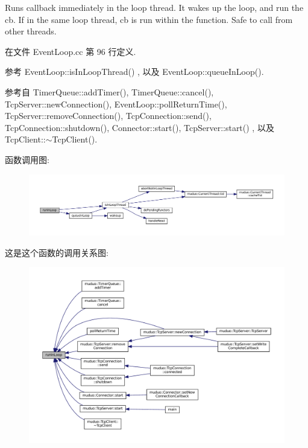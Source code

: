 Runs callback immediately in the loop thread. It wakes up the loop, and run the cb. If in the same loop thread, cb is run within the function. Safe to call from other threads. 

在文件 Event\+Loop.\+cc 第 96 行定义.



参考 Event\+Loop\+::is\+In\+Loop\+Thread() , 以及 Event\+Loop\+::queue\+In\+Loop().



参考自 Timer\+Queue\+::add\+Timer(), Timer\+Queue\+::cancel(), Tcp\+Server\+::new\+Connection(), Event\+Loop\+::poll\+Return\+Time(), Tcp\+Server\+::remove\+Connection(), Tcp\+Connection\+::send(), Tcp\+Connection\+::shutdown(), Connector\+::start(), Tcp\+Server\+::start() , 以及 Tcp\+Client\+::$\sim$\+Tcp\+Client().

函数调用图\+:
\nopagebreak
\begin{figure}[H]
\begin{center}
\leavevmode
\includegraphics[width=350pt]{classmuduo_1_1EventLoop_acf6a4570703c6edf29ae2d28cf6767cb_cgraph}
\end{center}
\end{figure}
这是这个函数的调用关系图\+:
\nopagebreak
\begin{figure}[H]
\begin{center}
\leavevmode
\includegraphics[width=350pt]{classmuduo_1_1EventLoop_acf6a4570703c6edf29ae2d28cf6767cb_icgraph}
\end{center}
\end{figure}
\mbox{\label{classmuduo_1_1EventLoop_acaa4a191936aacf608d279a6f343d533}} 
